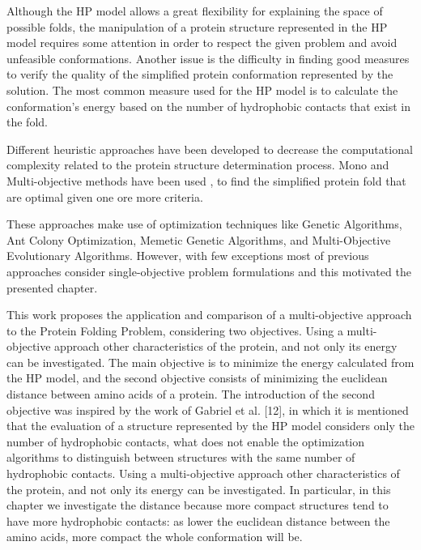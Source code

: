 Although the HP model allows a great flexibility for explaining the space of possible folds, the manipulation of a protein structure represented in the HP model requires some attention in order to respect the given problem and avoid unfeasible conformations. Another issue is the difficulty in finding good measures to verify the quality of the simplified protein conformation represented by the solution. The most common measure used for the HP model is to calculate the conformation's energy based on the number of hydrophobic contacts that exist in the fold. 



Different heuristic approaches have been developed to decrease the computational complexity related to the protein structure determination process. Mono and Multi-objective methods have been used \cite{custodio2004investigation, hsu2003growth, krasnogor2002multimeme, lin2011protein, unger1993genetic, gabriel2012algoritmos}, to find the simplified protein fold that are optimal given one ore more criteria.

 These approaches make use of optimization techniques like Genetic Algorithms, Ant Colony Optimization, Memetic Genetic Algorithms, and Multi-Objective Evolutionary Algorithms. However, with few exceptions most of previous approaches consider single-objective problem formulations and this motivated the presented chapter. 
 

 
This work proposes the application and comparison of a multi-objective approach to the Protein Folding Problem, considering two objectives. Using a multi-objective approach other characteristics of the protein, and not only its energy can be investigated. The main objective is to minimize the energy calculated from the HP model, and the second objective consists of minimizing the euclidean distance between amino acids of a protein. The introduction of the second objective was inspired by the work of Gabriel et al. [12], in which it is mentioned that the evaluation of a structure represented by the HP model considers only the number of hydrophobic contacts, what does not enable the optimization algorithms to distinguish between structures with the same number of hydrophobic contacts. Using a multi-objective approach other characteristics of the protein, and not only its energy can be investigated. In particular, in this chapter we investigate the distance because more compact structures tend to have more hydrophobic contacts: as lower the euclidean distance between the amino acids, more compact the whole conformation will be.

